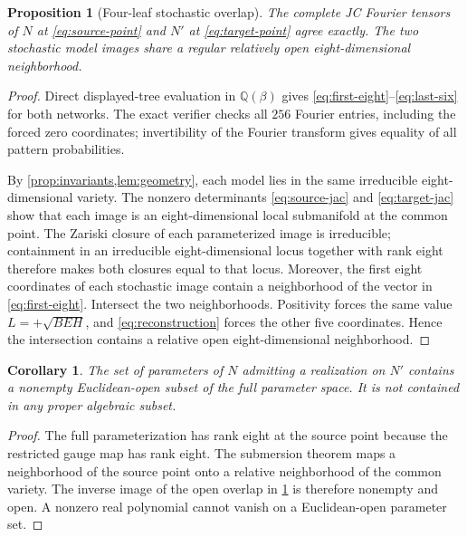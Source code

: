 \documentclass[11pt]{article}
\newtheorem{proposition}[theorem]{Proposition}
\newtheorem{corollary}[theorem]{Corollary}
\theoremstyle{remark}
\begin{document}
\begin{proposition}[Four-leaf stochastic overlap]\label{prop:overlap}
The complete JC Fourier tensors of $N$ at \eqref{eq:source-point} and $N'$
at \eqref{eq:target-point} agree exactly.  The two stochastic model images
share a regular relatively open eight-dimensional neighborhood.
\end{proposition}

\begin{proof}
Direct displayed-tree evaluation in $\mathbb Q(\beta)$ gives
\eqref{eq:first-eight}--\eqref{eq:last-six} for both networks.  The exact
verifier checks all $256$ Fourier entries, including the forced zero
coordinates; invertibility of the Fourier transform gives equality of all
pattern probabilities.

By \cref{prop:invariants,lem:geometry}, each model lies in the same
irreducible eight-dimensional variety.  The nonzero determinants
\eqref{eq:source-jac} and \eqref{eq:target-jac} show that each image is an
eight-dimensional local submanifold at the common point.  The Zariski closure
of each parameterized image is irreducible; containment in an irreducible
eight-dimensional locus together with rank eight therefore makes both
closures equal to that locus.  Moreover, the first eight coordinates of each
stochastic image contain a neighborhood of the vector in
\eqref{eq:first-eight}.  Intersect the two neighborhoods.  Positivity forces
the same value $L=+\sqrt{BEH}$, and \eqref{eq:reconstruction} forces the other
five coordinates.  Hence the intersection contains a relative open
eight-dimensional neighborhood.
\end{proof}

\begin{corollary}\label{cor:generic-failure}
The set of parameters of $N$ admitting a realization on $N'$ contains a
nonempty Euclidean-open subset of the full parameter space.  It is not
contained in any proper algebraic subset.
\end{corollary}

\begin{proof}
The full parameterization has rank eight at the source point because the
restricted gauge map has rank eight.  The submersion theorem maps a
neighborhood of the source point onto a relative neighborhood of the common
variety.  The inverse image of the open overlap in \cref{prop:overlap} is
therefore nonempty and open.  A nonzero real polynomial cannot vanish on a
Euclidean-open parameter set.
\end{proof}
\end{document}
